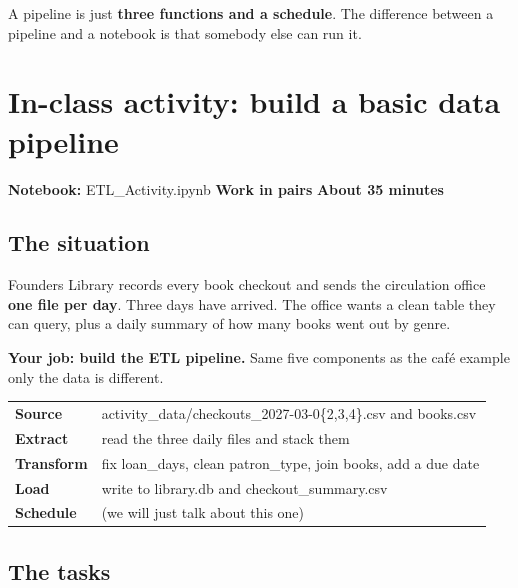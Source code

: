 \documentclass[11pt,letterpaper]{article}
\newcommand{\py}[1]{{\ttfamily\small#1}}
\begin{document}
\begin{keynote}
A pipeline is just \textbf{three functions and a schedule}. The difference between a pipeline and a
notebook is that somebody else can run it.
\end{keynote}

\newpage
\section{In-class activity: build a basic data pipeline}

{\sffamily\small\color{muted}\textbf{Notebook:} \py{ETL\_Activity.ipynb} \textbullet{}
\textbf{Work in pairs} \textbullet{} \textbf{About 35 minutes}}

\subsection*{\sffamily The situation}

Founders Library records every book checkout and sends the circulation office \textbf{one file per
day}. Three days have arrived. The office wants a clean table they can query, plus a daily summary of
how many books went out by genre.

\textbf{Your job: build the ETL pipeline.} Same five components as the caf\'e example \textemdash{}
only the data is different.

{\sffamily\footnotesize
\begin{tabular}{@{}p{2.2cm}p{11.5cm}@{}}
\toprule
\textbf{Source}    & \py{activity\_data/checkouts\_2027-03-0\{2,3,4\}.csv} and \py{books.csv} \\
\textbf{Extract}   & read the three daily files and stack them \\
\textbf{Transform} & fix \py{loan\_days}, clean \py{patron\_type}, join \py{books}, add a due date \\
\textbf{Load}      & write to \py{library.db} and \py{checkout\_summary.csv} \\
\textbf{Schedule}  & (we will just talk about this one) \\
\bottomrule
\end{tabular}}

\subsection*{\sffamily The tasks}
\end{document}
